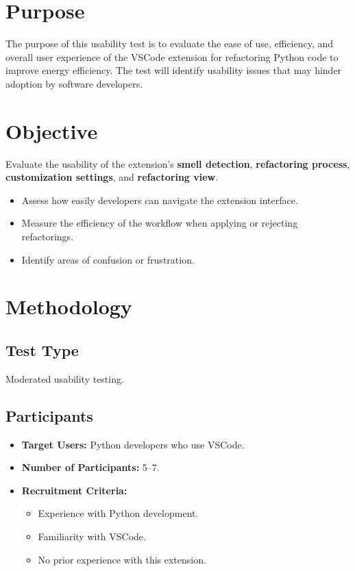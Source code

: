 \documentclass[12pt, titlepage]{article}
\begin{document}
\section*{Purpose}
The purpose of this usability test is to evaluate the ease of use,
efficiency, and overall user experience of the VSCode extension for
refactoring Python code to improve energy efficiency. The test will
identify usability issues that may hinder adoption by software developers.

\section*{Objective}
Evaluate the usability of the extension's \textbf{smell detection},
\textbf{refactoring process}, \textbf{customization settings}, and
\textbf{refactoring view}.

\begin{itemize}
  \item Assess how easily developers can navigate the extension interface.
  \item Measure the efficiency of the workflow when applying or
    rejecting refactorings.
  \item Identify areas of confusion or frustration.
\end{itemize}

\section*{Methodology}
\subsection*{Test Type}
Moderated usability testing.

\subsection*{Participants}
\begin{itemize}
  \item \textbf{Target Users:} Python developers who use VSCode.
  \item \textbf{Number of Participants:} 5–7.
  \item \textbf{Recruitment Criteria:}
    \begin{itemize}
      \item Experience with Python development.
      \item Familiarity with VSCode.
      \item No prior experience with this extension.
    \end{itemize}
\end{itemize}
\end{document}
